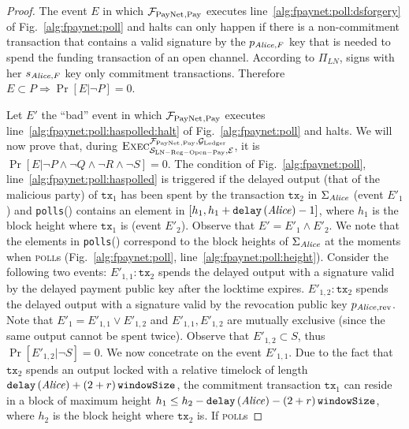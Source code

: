 \begin{proof}
  The event $E$ in which $\mathcal{F}_{\mathrm{PayNet}}{}_{\mathrm{, Pay}}$ executes
  line~\ref{alg:fpaynet:poll:dsforgery} of Fig.~\ref{alg:fpaynet:poll} and
  halts can only happen if there is a non-commitment transaction that contains a
  valid signature by the $p_{\mathit{Alice}, F}$ key that is needed to spend the funding
  transaction of an open channel. According to $\Pi_{LN}$, \alice{} signs with
  her $s_{\mathit{Alice}, F}$ key only commitment transactions. Therefore $E \subset P
  \Rightarrow \Pr[E | \neg P] = 0$.

  Let $E'$ the ``bad'' event in which $\mathcal{F}_{\mathrm{PayNet}}{}_{\mathrm{, Pay}}$ executes
  line~\ref{alg:fpaynet:poll:haspolled:halt} of Fig.~\ref{alg:fpaynet:poll} and
  halts. We will now prove that, during $\textsc{Exec}^{\mathcal{F}_{\mathrm{PayNet}}{}_{\mathrm{,
  Pay}}, \mathcal{G}_{\mathrm{Ledger}}}_{\mathcal{S}_{\mathrm{LN - Reg - Open - Pay}}, \mathcal{E}}$,
  it is $\Pr[E | \neg P \wedge \neg Q \wedge \neg R \wedge \neg S] = 0$. The
  condition of Fig.~\ref{alg:fpaynet:poll},
  line~\ref{alg:fpaynet:poll:haspolled} is triggered if the delayed output (that
  of the malicious party) of $\mathtt{tx}_1$ has been spent by the transaction
  $\mathtt{tx}_2$ in $\Sigma_{\mathit{Alice}}$ (event $E'_1$) and \texttt{polls}(\alice)
  contains an element in $\left[h_1, h_1 + \mathtt{delay}\left(\mathit{Alice}\right) -
  1\right]$, where $h_1$ is the block height where $\mathtt{tx}_1$ is (event
  $E'_2$). Observe that $E' = E'_1 \wedge E'_2$. We note that the elements in
  \texttt{polls}(\alice) correspond to the block heights of $\Sigma_{\mathit{Alice}}$ at
  the moments when \alice{} \textsc{poll}s (Fig.~\ref{alg:fpaynet:poll},
  line~\ref{alg:fpaynet:poll:height}). Consider the following two events:
  $E'_{1,1}: \mathtt{tx}_2$ spends the delayed output with a signature valid by
  the delayed payment public key after the locktime expires. $E'_{1,2}:
  \mathtt{tx}_2$ spends the delayed output with a signature valid by the
  revocation public key $p_{\mathit{Alice}, \mathrm{rev}}$. Note that $E'_1 = E'_{1,1}
  \vee E'_{1,2}$ and $E'_{1,1}, E'_{1,2}$ are mutually exclusive (since the same
  output cannot be spent twice). Observe that $E'_{1,2} \subset S$, thus
  $\Pr\left[E'_{1,2} | \neg S\right] = 0$. We now concetrate on the event
  $E'_{1,1}$. Due to the fact that $\mathtt{tx}_2$ spends an output locked with
  a relative timelock of length $\mathtt{delay}\left(\mathit{Alice}\right) + \left(2 + r\right)\texttt{windowSize}$,
  the commitment transaction $\mathtt{tx}_1$ can reside in a block of maximum
  height $h_1 \leq h_2 - \mathtt{delay}\left(\mathit{Alice}\right) - \left(2 + r\right)\texttt{windowSize}$, where
  $h_2$ is the block height where $\mathtt{tx}_2$ is. If \alice{} \textsc{poll}s

\end{proof}
